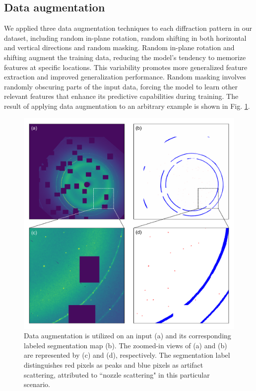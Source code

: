 \documentclass[a4paper]{article}
\begin{document}
\subsection{Data augmentation}

We applied three data augmentation techniques to each diffraction pattern in our dataset, including random in-plane rotation, random shifting in both horizontal and vertical directions and random masking.  Random in-plane rotation and shifting augment the training data, reducing the model's tendency to memorize features at specific locations.  This variability promotes more generalized feature extraction and improved generalization performance.  Random masking involves randomly obscuring parts of the input data, forcing the model to learn other relevant features that enhance its predictive capabilities during training.  The result of applying data augmentation to an arbitrary example is shown in Fig. \ref{fig : data aug}.

\begin{figure}[!ht]
\includegraphics[width=\textwidth,keepaspectratio]
{./figures/data_aug.pdf}
\caption{Data augmentation is utilized on an input (a) and its corresponding
labeled segmentation map (b). The zoomed-in views of (a) and (b) are represented
by (c) and (d), respectively. The segmentation label distinguishes red pixels as
peaks and blue pixels as artifact scattering, attributed to ``nozzle scattering"
in this particular scenario.}
\label{fig : data aug}
\end{figure}
\end{document}
